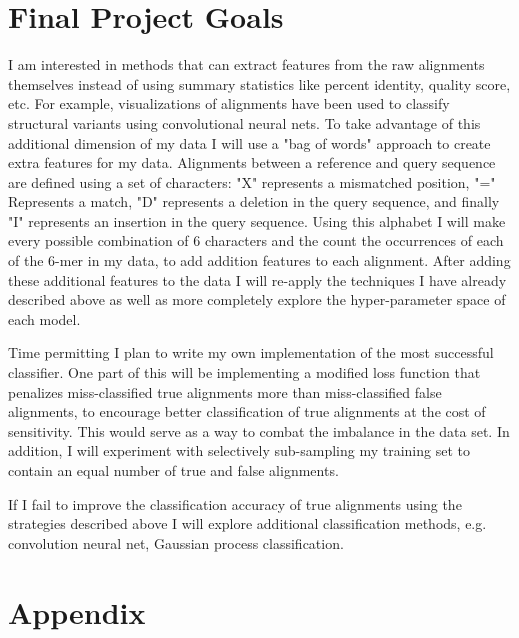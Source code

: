 \documentclass{article}
\newcommand{\beginsupplement}{%
        \renewcommand{\thetable}{S\arabic{table}}%
        \renewcommand{\thefigure}{S\arabic{figure}}%
}
\begin{document}
\section*{Final Project Goals}

I am interested in methods that can extract features from the raw alignments themselves instead of using summary statistics like percent identity, quality score, etc. For example, visualizations of alignments have been used to classify structural variants using convolutional neural nets. To take advantage of this additional dimension of my data I will use a "bag of words" approach to create extra features for my data. Alignments between a reference and query sequence are defined using a set of characters: "X" represents a mismatched position, "=" Represents a match, "D" represents a deletion in the query sequence, and finally "I" represents an insertion in the query sequence. Using this alphabet I will make every possible combination of 6 characters and the count the occurrences of each of the 6-mer in my data, to add addition features to each alignment. After adding these additional features to the data I will re-apply the techniques I have already described above as well as more completely explore the hyper-parameter space of each model.

Time permitting I plan to write my own implementation of the most successful classifier. One part of this will be implementing a modified loss function that penalizes miss-classified true alignments more than miss-classified false alignments, to encourage better classification of true alignments at the cost of sensitivity. This would serve as a way to combat the imbalance in the data set. In addition, I will experiment with selectively sub-sampling my training set to contain an equal number of true and false alignments. 

If I fail to improve the classification accuracy of true alignments using the strategies described above I will explore additional classification methods, e.g. convolution neural net, Gaussian process classification. 

\printbibliography 


\beginsupplement

\section*{Appendix}
\end{document}
